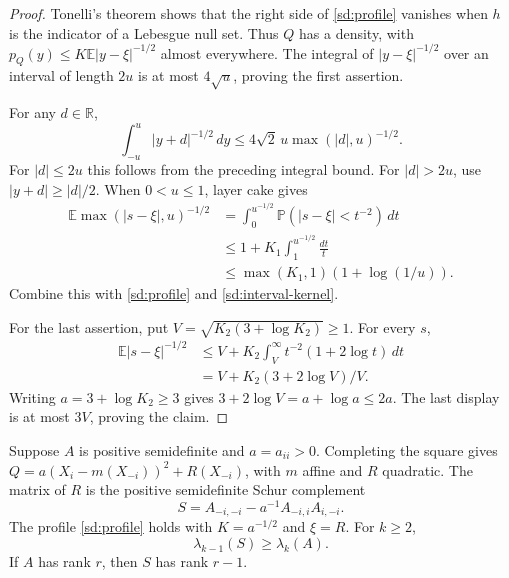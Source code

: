 \begin{proof}
Tonelli's theorem shows that the right side of \eqref{sd:profile}
vanishes when $h$ is the indicator of a Lebesgue null set.  Thus $Q$
has a density, with
$p_Q(y)\leq K\mathbb E|y-\xi|^{-1/2}$ almost everywhere.
The integral of $|y-\xi|^{-1/2}$ over an interval of length $2u$
is at most $4\sqrt u$, proving the first assertion.

For any $d\in\mathbb R$,
\begin{equation}\label{sd:interval-kernel}
 \int_{-u}^u|y+d|^{-1/2}\,dy
 \leq4\sqrt2\,u\max(|d|,u)^{-1/2}.
\end{equation}
For $|d|\leq2u$ this follows from the preceding integral bound.
For $|d|>2u$, use $|y+d|\geq|d|/2$.
When $0<u\leq1$, layer cake gives
\begin{align*}
 \mathbb E\max(|s-\xi|,u)^{-1/2}
 &=\int_0^{u^{-1/2}}\mathbb P(|s-\xi|<t^{-2})\,dt\\
 &\leq1+K_1\int_1^{u^{-1/2}}\frac{dt}{t}\\
 &\leq\max(K_1,1)(1+\log(1/u)).
\end{align*}
Combine this with \eqref{sd:profile} and \eqref{sd:interval-kernel}.

For the last assertion, put $V=\sqrt{K_2(3+\log K_2)}\geq1$.
For every $s$,
\begin{align*}
 \mathbb E|s-\xi|^{-1/2}
 &\leq V+K_2\int_V^\infty t^{-2}(1+2\log t)\,dt\\
 &=V+K_2(3+2\log V)/V.
\end{align*}
Writing $a=3+\log K_2\geq3$ gives
$3+2\log V=a+\log a\leq2a$.
The last display is at most $3V$, proving the claim.
\end{proof}

\begin{lemma}\label{sd:pivot}
Suppose $A$ is positive semidefinite and $a=a_{ii}>0$.
Completing the square gives
$Q=a(X_i-m(X_{-i}))^2+R(X_{-i})$, with $m$ affine and $R$ quadratic.
The matrix of $R$ is the positive semidefinite Schur complement
\[
 S=A_{-i,-i}-a^{-1}A_{-i,i}A_{i,-i}.
\]
The profile \eqref{sd:profile} holds with $K=a^{-1/2}$ and $\xi=R$.
For $k\geq2$,
\begin{equation}\label{sd:schur-eigenvalue}
 \lambda_{k-1}(S)\geq\lambda_k(A).
\end{equation}
If $A$ has rank $r$, then $S$ has rank $r-1$.
\end{lemma}

